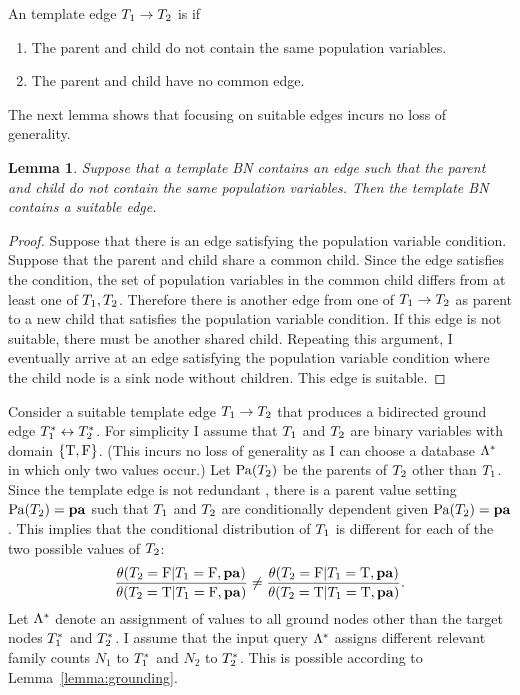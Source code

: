 \documentclass{sfuthesis}
\newtheorem{lemma}{Lemma}
\begin{document}
\begin{appendices}
\begin{definition} \label{def:suitable}
An template edge $T_{1} \rightarrow T_{2}$ is  if
\begin{enumerate}
\item The parent and child do not contain the same population variables.
\item The parent and child have no common edge.
\end{enumerate}
\end{definition}
The next lemma shows that focusing on suitable edges incurs no loss of generality.

\begin{lemma} \label{lemma:suitable}
Suppose that a template BN contains an edge such that the parent and child do not contain the same population variables. Then the template BN contains a suitable edge. 
\end{lemma}

\begin{proof}
Suppose that there is an edge satisfying the population variable condition. Suppose that the parent and child share a common child. Since the edge satisfies the condition, the set of population variables in the common child differs from at least one of  $T_{1}, T_{2}$. Therefore there is another edge from one of  $T_{1} \rightarrow T_{2}$ as parent to a new child that satisfies the population variable condition. If this edge is not suitable, there must be another shared child. Repeating this argument, I  eventually arrive at an edge satisfying the population variable condition  where the child node is a sink node without children. This edge is suitable.
\end{proof}

Consider a suitable template edge $T_{1} \rightarrow T_{2}$ that produces a bidirected ground edge $T_{1}^{*}\hspace{0.0ex} \leftrightarrow T_{2}^{*}\hspace{0.0ex}$. For simplicity I  assume that $T_{1}$ and $T_{2}$ are binary variables with domain $\{\mathrm{T},\mathrm{F}\}$. (This incurs no loss of generality as I  can choose a database $\Lambda^{*}\hspace{0.0ex}$ in which only two values occur.) Let $\mathrm{Pa}(T_{2})$ be the parents of $T_{2}$ other than $T_{1}$. Since the template edge is not redundant \cite{Pearl1988}, there is a parent value setting $\mathrm{Pa}(T_{2}) = \mathbf{pa}$ such that $T_{1}$ and $T_{2}$ are conditionally dependent given $\mathrm{Pa}(T_{2}) = \mathbf{pa}$. This implies that the conditional distribution of $T_{1}$ is different for each of the two possible values of $T_{2}$:
\begin{equation} \label{eq:dependence}
\frac{\theta(T_{2} = \mathrm{F}|T_{1} = \mathrm{F},\mathbf{pa})}{\theta(T_{2} = \mathrm{T}|T_{1} = \mathrm{F},\mathbf{pa})} \neq \frac{\theta(T_{2} = \mathrm{F}|T_{1} = \mathrm{T},\mathbf{pa})}{\theta(T_{2} = \mathrm{T}|T_{1} = \mathrm{T},\mathbf{pa})}.
\end{equation}
Let $\Lambda^{*}\hspace{0.0ex}$ denote an assignment of values to all ground nodes other than the target nodes $T_{1}^{*}\hspace{0.0ex}$ and $ T_{2}^{*}\hspace{0.0ex}$. I  assume that the input query $\Lambda^{*}\hspace{0.0ex}$ assigns different relevant family counts $N_{1}$ to $T_{1}^{*}\hspace{0.0ex}$ and $N_{2}$ to $T_{2}^{*}\hspace{0.0ex}$. This is possible according to Lemma~\ref{lemma:grounding}. 

\end{appendices}
\end{document}
